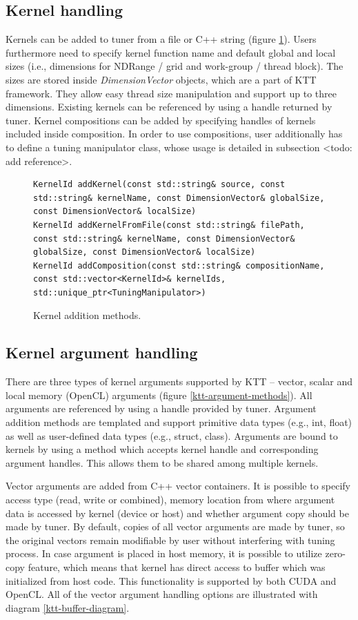 \documentclass
[
    digital, %
    oneside, %
    table, %
    nolof, %
    nolot, %
    nocover %
]{fithesis3}
\begin{document}
\subsection{Kernel handling}
Kernels can be added to tuner from a file or C++ string (figure \ref{ktt-kernel-methods}). Users furthermore need to specify kernel function name and
default global and local sizes (i.e., dimensions for NDRange / grid and work-group / thread block). The sizes are stored inside \textit{DimensionVector}
objects, which are a part of KTT framework. They allow easy thread size manipulation and support up to three dimensions. Existing kernels can be
referenced by using a handle returned by tuner. Kernel compositions can be added by specifying handles of kernels included inside composition. In
order to use compositions, user additionally has to define a tuning manipulator class, whose usage is detailed in subsection <todo: add reference>.
\begin{figure}
\begin{lstlisting}
KernelId addKernel(const std::string& source, const std::string& kernelName, const DimensionVector& globalSize, const DimensionVector& localSize)
KernelId addKernelFromFile(const std::string& filePath, const std::string& kernelName, const DimensionVector& globalSize, const DimensionVector& localSize)
KernelId addComposition(const std::string& compositionName, const std::vector<KernelId>& kernelIds, std::unique_ptr<TuningManipulator>)
\end{lstlisting}
\caption{Kernel addition methods.}
\label{ktt-kernel-methods}
\end{figure}

\subsection{Kernel argument handling}
There are three types of kernel arguments supported by KTT -- vector, scalar and local memory (OpenCL) arguments (figure \ref{ktt-argument-methods}).
All arguments are referenced by using a handle provided by tuner. Argument addition methods are templated and support primitive data types (e.g.,
int, float) as well as user-defined data types (e.g., struct, class). Arguments are bound to kernels by using a method which accepts kernel handle
and corresponding argument handles. This allows them to be shared among multiple kernels.

Vector arguments are added from C++ vector containers. It is possible to specify access type (read, write or combined), memory location from where
argument data is accessed by kernel (device or host) and whether argument copy should be made by tuner. By default, copies of all vector arguments
are made by tuner, so the original vectors remain modifiable by user without interfering with tuning process. In case argument is placed in host
memory, it is possible to utilize zero-copy feature, which means that kernel has direct access to buffer which was initialized from host code. This
functionality is supported by both CUDA and OpenCL. All of the vector argument handling options are illustrated with diagram \ref{ktt-buffer-diagram}.
\end{document}

